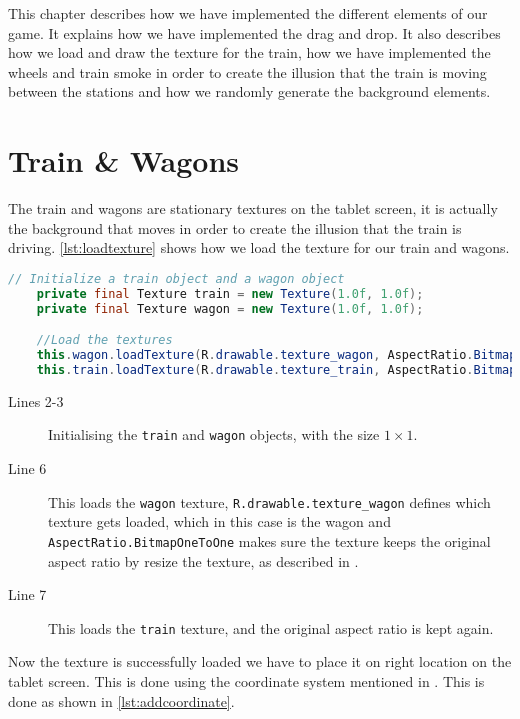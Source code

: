 This chapter describes how we have implemented the different elements of our game. It explains how we have implemented the drag and drop. It also describes how we load and draw the texture for the train, how we have implemented the wheels and train smoke in order to create the illusion that the train is moving between the stations and how we randomly generate the background elements.



\section{Train \& Wagons}
The train and wagons are stationary textures on the tablet screen, it is actually the background that moves in order to create the illusion that the train is driving. \autoref{lst:loadtexture} shows how we load the texture for our train and wagons.

\begin{lstlisting}[language=java,firstnumber=1,caption={Loading the texture for our train and wagons.},label=lst:loadtexture] 
	// Initialize a train object and a wagon object
	private final Texture train = new Texture(1.0f, 1.0f);
	private final Texture wagon = new Texture(1.0f, 1.0f);

	//Load the textures
	this.wagon.loadTexture(R.drawable.texture_wagon, AspectRatio.BitmapOneToOne);
	this.train.loadTexture(R.drawable.texture_train, AspectRatio.BitmapOneToOne); 
\end{lstlisting}

\begin{description}
\item[Lines 2-3] Initialising the \lstinline|train| and \lstinline|wagon| objects, with the size $1 \times 1$.
\item[Line 6] This loads the \lstinline|wagon| texture, \lstinline|R.drawable.texture_wagon| defines which texture gets loaded, which in this case is the wagon and \lstinline|AspectRatio.BitmapOneToOne| makes sure the texture keeps the original aspect ratio by resize the texture, as described in .
\item[Line 7] This loads the \lstinline|train| texture, and the original aspect ratio is kept again.
\end{description}

Now the texture is successfully loaded we have to place it on right location on the tablet screen. This is done using the coordinate system mentioned in . This is done as shown in \autoref{lst:addcoordinate}.

